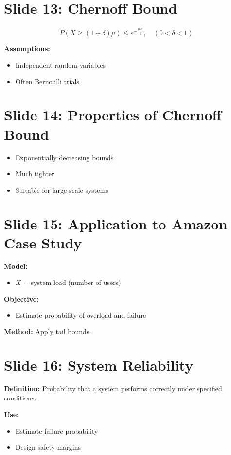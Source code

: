 \documentclass[12pt]{article}
\begin{document}
\section*{Slide 13: Chernoff Bound}
\[
P(X \geq (1+\delta)\mu) \leq e^{-\frac{\mu \delta^2}{3}}, \quad (0 < \delta < 1)
\]

\textbf{Assumptions:}
\begin{itemize}
    \item Independent random variables
    \item Often Bernoulli trials
\end{itemize}

\section*{Slide 14: Properties of Chernoff Bound}
\begin{itemize}
    \item Exponentially decreasing bounds
    \item Much tighter
    \item Suitable for large-scale systems
\end{itemize}

\section*{Slide 15: Application to Amazon Case Study}
\textbf{Model:}
\begin{itemize}
    \item $X$ = system load (number of users)
\end{itemize}

\textbf{Objective:}
\begin{itemize}
    \item Estimate probability of overload and failure
\end{itemize}

\textbf{Method:} Apply tail bounds.

\section*{Slide 16: System Reliability}
\textbf{Definition:} Probability that a system performs correctly under specified conditions.

\textbf{Use:}
\begin{itemize}
    \item Estimate failure probability
    \item Design safety margins
\end{itemize}
\end{document}
